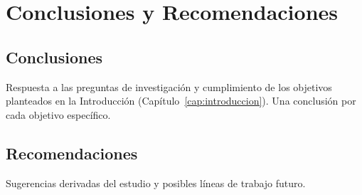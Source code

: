 \chapter{Conclusiones y Recomendaciones}
\label{cap:conclusiones}


\section{Conclusiones}

Respuesta a las preguntas de investigación y cumplimiento de los objetivos
planteados en la Introducción (Capítulo~\ref{cap:introduccion}). Una conclusión
por cada objetivo específico.

\section{Recomendaciones}

Sugerencias derivadas del estudio y posibles líneas de trabajo futuro.
